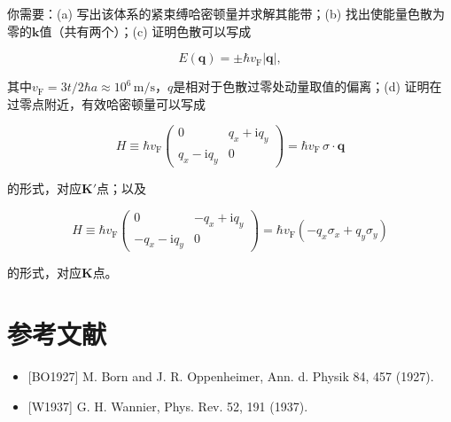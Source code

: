 你需要：(a) 写出该体系的紧束缚哈密顿量并求解其能带；(b) 找出使能量色散为零的$\mathbf k$值（共有两个）；(c) 证明色散可以写成

\begin{equation*}
E(\mathbf q) = \pm\hbar v_{\mathrm F}|\mathbf q|,
\tag{3.41}
\end{equation*}

其中$v_{\mathrm F}=3t/2\hbar a\approx 10^{6}\,\mathrm{m/s}$，$q$是相对于色散过零处动量取值的偏离；(d) 证明在过零点附近，有效哈密顿量可以写成

\begin{equation*}
H \equiv \hbar v_{\mathrm F}\begin{pmatrix} 0 & q_x+\mathrm i q_y \\ q_x-\mathrm i q_y & 0 \end{pmatrix} = \hbar v_{\mathrm F}\,\sigma\cdot\mathbf q
\end{equation*}

的形式，对应$\mathbf K'$点；以及

\begin{equation*}
H \equiv \hbar v_{\mathrm F}\begin{pmatrix} 0 & -q_x+\mathrm i q_y \\ -q_x-\mathrm i q_y & 0 \end{pmatrix} = \hbar v_{\mathrm F}(-q_x\sigma_x + q_y\sigma_y)
\end{equation*}

的形式，对应$\mathbf K$点。

\section*{参考文献}

\begin{itemize}[leftmargin=2em,itemsep=0pt,parsep=0pt,label={}]
\item {[BO1927]} M. Born and J. R. Oppenheimer, Ann. d. Physik 84, 457 (1927).
\item {[W1937]} G. H. Wannier, Phys. Rev. 52, 191 (1937).
\end{itemize}
